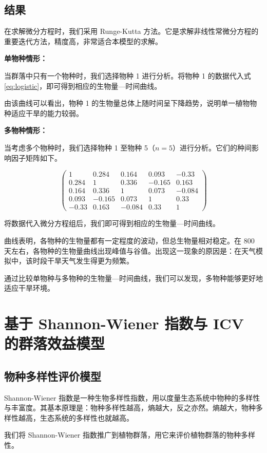 \documentclass[11pt,a4paper]{ctexart}
\begin{document}
\subsection{结果}

在求解微分方程时，我们采用 Runge-Kutta 方法。它是求解非线性常微分方程的重要迭代方法，精度高，非常适合本模型的求解。

\textbf{单物种情形：}

当群落中只有一个物种时，我们选择物种 1 进行分析。将物种 1 的数据代入式 \eqref{eq:logistic}，即可得到相应的生物量—时间曲线。

由该曲线可以看出，物种 1 的生物量总体上随时间呈下降趋势，说明单一植物物种适应干旱的能力较弱。

\textbf{多物种情形：}

当考虑多个物种时，我们选择物种 1 至物种 5（$n=5$）进行分析。它们的种间影响因子矩阵如下。

\[
\begin{pmatrix}
1 & 0.284 & 0.164 & 0.093 & -0.33\\
0.284 & 1 & 0.336 & -0.165 & 0.163\\
0.164 & 0.336 & 1 & 0.073 & -0.084\\
0.093 & -0.165 & 0.073 & 1 & 0.33\\
-0.33 & 0.163 & -0.084 & 0.33 & 1
\end{pmatrix}
\]

将数据代入微分方程组后，我们即可得到相应的生物量—时间曲线。

曲线表明，各物种的生物量都有一定程度的波动，但总生物量相对稳定。在 800 天左右，各物种的生物量曲线出现峰值与谷值。出现这一现象的原因是：在天气模拟中，该时段干旱天气发生得更为频繁。

通过比较单物种与多物种的生物量—时间曲线，我们可以发现，多物种能够更好地适应干旱环境。
\section{基于 Shannon-Wiener 指数与 ICV 的群落效益模型}

\subsection{物种多样性评价模型}

Shannon-Wiener 指数是一种生物多样性指数，用以度量生态系统中物种的多样性与丰富度。其基本原理是：物种多样性越高，熵越大，反之亦然。熵越大，物种多样性越高，生态系统的多样性也就越高。

我们将 Shannon-Wiener 指数推广到植物群落，用它来评价植物群落的物种多样性。
\end{document}
